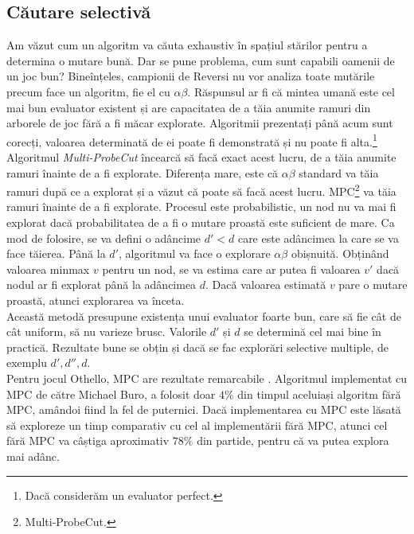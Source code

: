 \documentclass[12pt,twoside,a4paper,fleqn]{book}
\theoremstyle{definition}
\begin{document}
\subsection{Căutare selectivă}
Am văzut cum un algoritm va căuta exhaustiv în spațiul stărilor pentru a determina o mutare bună. Dar se pune problema, cum sunt capabili oamenii de un joc bun? Bineînțeles, campionii de Reversi nu vor analiza toate mutările precum face un algoritm, fie el cu $\alpha \beta$. Răspunsul ar fi că mintea umană este cel mai bun evaluator existent și are capacitatea de a tăia anumite ramuri din arborele de joc fără a fi măcar explorate. Algoritmii prezentați până acum sunt corecți, valoarea determinată de ei poate fi demonstrată și nu poate fi alta.\footnote{Dacă considerăm un evaluator perfect.}\\
Algoritmul \emph{Multi-ProbeCut} \cite{buro_mpc_curs, buro_mpc} încearcă să facă exact acest lucru, de a tăia anumite ramuri înainte de a fi explorate. Diferența mare, este că $\alpha \beta$ standard va tăia ramuri după ce a explorat și a văzut că poate să facă acest lucru. MPC\footnote{Multi-ProbeCut.} va tăia ramuri înainte de a fi explorate. Procesul este probabilistic, un nod nu va mai fi explorat dacă probabilitatea de a fi o mutare proastă este suficient de mare. Ca mod de folosire, se va defini o adâncime $d' < d$ care este adâncimea la care se va face tăierea. Până la $d'$, algoritmul va face o explorare $\alpha \beta$ obișnuită. Obținând valoarea minmax $v$ pentru un nod, se va estima care ar putea fi valoarea $v'$ dacă nodul ar fi explorat până la adâncimea $d$. Dacă valoarea estimată $v$ pare o mutare proastă, atunci explorarea va înceta.\\
Această metodă presupune existența unui evaluator foarte bun, care să fie cât de cât uniform, să nu varieze brusc. Valorile $d'$ și $d$ se determină cel mai bine în practică. Rezultate bune se obțin și dacă se fac explorări selective multiple, de exemplu $d', d'', d$.\\
Pentru jocul Othello, MPC are rezultate remarcabile \cite{buro_mpc}. Algoritmul implementat cu MPC de către Michael Buro, a folosit doar $4\%$ din timpul aceluiași algoritm fără MPC, amândoi fiind la fel de puternici. Dacă implementarea cu MPC este lăsată să exploreze un timp comparativ cu cel al implementării fără MPC, atunci cel fără MPC va câștiga aproximativ $78\%$ din partide, pentru că va putea explora mai adânc.

\tableofcontents
\end{document}

